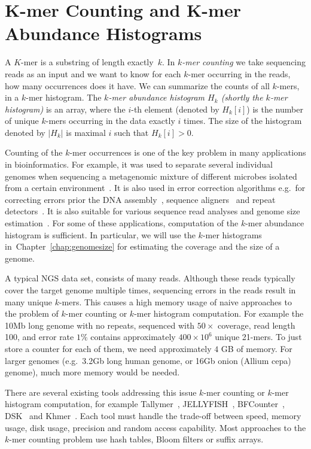 \chapter[K-mer Counting]{K-mer Counting and K-mer Abundance Histograms}

A $K$-mer is a substring of length exactly~$k$. In \emph{$k$-mer counting} we take sequencing reads as an input and we want to know for each $k$-mer occurring in the reads, how many occurrences does it have. We can summarize the counts of all $k$-mers, in a $k$-mer histogram.
The \emph{$k$-mer abundance histogram $H_k$ (shortly the $k$-mer histogram)} is an array, where the $i$-th element (denoted by $H_k[i]$) is the number of unique $k$-mers occurring in the data exactly $i$ times. The size of the histogram denoted by $|H_k|$ is maximal $i$ such that $H_k[i] > 0$.

Counting of the $k$-mer occurrences is one of the key problem in many applications in bioinformatics.
For example, it was used to separate several individual
genomes when sequencing a metagenomic mixture of different microbes isolated from a certain environment~\cite{Wu2011, Wang2012}.
It is also used in error correction algorithms e.g.\ for correcting errors prior the DNA assembly~\cite{Pevzner2001}, sequence aligners~\cite{edgar2004muscle} and repeat detectors~\cite{caponnetto2013efficiency}.
It is also suitable for various sequence read analyses and genome size estimation~\cite{covest, williams, waterman}.
For some of these applications, computation of the $k$-mer abundance histogram is sufficient.
In particular, we will use the $k$-mer histograms in~Chapter~\ref{chap:genomesize} for estimating the coverage and the size of a genome.

A typical NGS data set, consists of many reads. Although these reads typically cover the target genome multiple times, sequencing errors in the reads result in many unique $k$-mers.
This causes a high memory usage of naive approaches to the problem of $k$-mer counting or $k$-mer histogram computation.
For example the 10Mb long genome with no repeats, sequenced with $50\times$ coverage, read length 100, and error rate $1\%$ contains approximately $400\times 10^6$ unique 21-mers. To just store a counter for each of them, we need approximately $4$ GB of memory. For larger genomes (e.g.\ 3.2Gb long human genome, or 16Gb onion (Allium cepa) genome), much more memory would be needed.

There are several existing tools addressing this issue $k$-mer counting or $k$-mer histogram computation, for example Tallymer~\cite{tallymer}, JELLYFISH~\cite{jellyfish}, BFCounter~\cite{bfcounter}, DSK~\cite{dsk} and Khmer~\cite{khmer}. Each tool must handle the trade-off between speed, memory usage, disk usage, precision and random access capability. Most approaches to the $k$-mer counting problem use hash tables, Bloom filters or suffix arrays.

